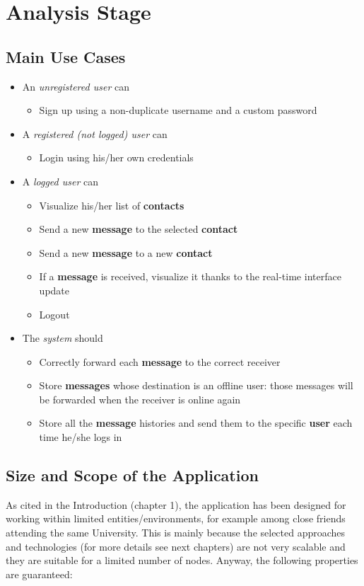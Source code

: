 \section{Analysis Stage}
\subsection{Main Use Cases}
\begin{itemize}
	\item An \textit{unregistered user} can
	\begin{itemize}
		\item Sign up using a non-duplicate username and a custom password
	\end{itemize}
	\item A \textit{registered (not logged) user} can
	\begin{itemize}
		\item Login using his/her own credentials
	\end{itemize}
	
	\item A \textit{logged user} can
	\begin{itemize}
		\item Visualize his/her list of \textbf{contacts}
		\item Send a new \textbf{message} to the selected \textbf{contact}
		\item Send a new \textbf{message}  to a new \textbf{contact}
		\item If a \textbf{message}  is received, visualize it thanks to the real-time interface update
		\item Logout
\end{itemize}
	\item The \textit{system} should
	\begin{itemize}
		\item Correctly forward each \textbf{message} to the correct receiver
		\item Store \textbf{messages} whose destination is an offline user: those messages will be forwarded when the receiver is online again
		\item Store all the \textbf{message} histories and send them to the specific \textbf{user} each time he/she logs in
	\end{itemize}
\end{itemize}

\subsection{Size and Scope of the Application}
As cited in the Introduction (chapter 1), the application has been designed for working within limited entities/environments, for example among close friends attending the same University. 
This is mainly because the selected approaches and technologies (for more details see next chapters) are not very scalable and they are suitable for a limited number of nodes.
Anyway, the following properties are guaranteed:


